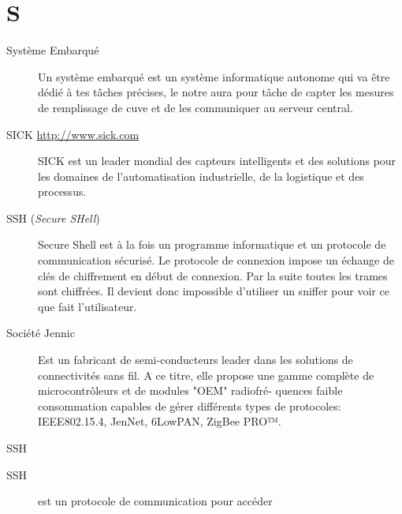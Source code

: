 \section{S}

\begin{description}

\item[Système Embarqué] Un système embarqué est un système informatique autonome
qui va être dédié à tes tâches précises, le notre aura pour tâche de capter les 
mesures de remplissage de cuve et de les communiquer au serveur central.

\item[SICK \url{http://www.sick.com}]
SICK est un leader mondial des capteurs intelligents et des solutions pour les domaines de l’automatisation industrielle, de la logistique et des processus.

\item[SSH (\textsl{Secure SHell})]
Secure Shell est à la fois un programme informatique et un protocole de communication sécurisé. Le protocole de connexion impose un échange de clés de chiffrement en début de connexion. Par la suite toutes les trames sont chiffrées. Il devient donc impossible d'utiliser un sniffer pour voir ce que fait l'utilisateur.

\item[Société Jennic]
Est un fabricant  de semi-conducteurs leader dans les solutions de connectivités sans fil. A ce titre, elle propose une gamme complète de microcontrôleurs et de modules "OEM" radiofré-
quences faible consommation capables de gérer différents types de protocoles: IEEE802.15.4, JenNet, 6LowPAN, ZigBee PRO™.




\end{description}

SSH

\begin{description}

\item[SSH] est un protocole de communication pour accéder 


\end{description}


